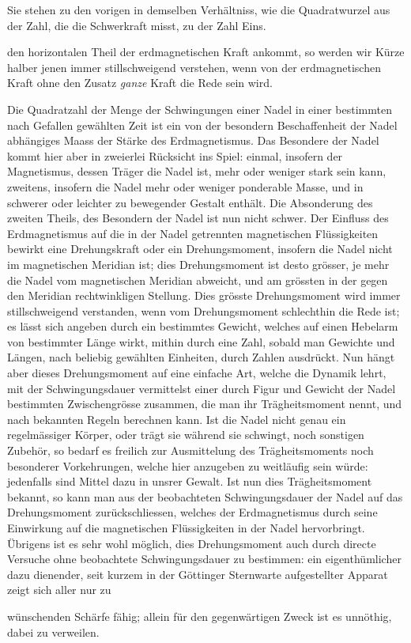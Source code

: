 \expandafter\def\csname HistoricalNoteText337\endcsname{Sie stehen zu den vorigen in demselben Verhältniss, wie die Quadratwurzel aus der Zahl, die die Schwerkraft misst, zu der Zahl Eins.}
\par\clearpage
{}
\noindent den horizontalen Theil der erdmagnetischen Kraft ankommt, so werden wir Kürze halber jenen immer stillschweigend verstehen, wenn von der erdmagnetischen Kraft ohne den Zusatz \textit{ganze} Kraft die Rede sein wird.

Die Quadratzahl der Menge der Schwingungen einer Nadel in einer bestimmten nach Gefallen gewählten Zeit ist ein von der besondern Beschaffenheit der Nadel abhängiges Maass der Stärke des Erdmagnetismus. Das Besondere der Nadel kommt hier aber in zweierlei Rücksicht ins Spiel: einmal, insofern der Magnetismus, dessen Träger die Nadel ist, mehr oder weniger stark sein kann, zweitens, insofern die Nadel mehr oder weniger ponderable Masse, und in schwerer oder leichter zu bewegender Gestalt enthält. Die Absonderung des zweiten Theils, des Besondern der Nadel ist nun nicht schwer. Der Einfluss des Erdmagnetismus auf die in der Nadel getrennten magnetischen Flüssigkeiten bewirkt eine Drehungskraft oder ein Drehungsmoment, insofern die Nadel nicht im magnetischen Meridian ist; dies Drehungsmoment ist desto grösser, je mehr die Nadel vom magnetischen Meridian abweicht, und am grössten in der gegen den Meridian rechtwinkligen Stellung. Dies grösste Drehungsmoment wird immer stillschweigend verstanden, wenn vom Drehungsmoment schlechthin die Rede ist; es lässt sich angeben durch ein bestimmtes Gewicht, welches auf einen Hebelarm von bestimmter Länge wirkt, mithin durch eine Zahl, sobald man Gewichte und Längen, nach beliebig gewählten Einheiten, durch Zahlen ausdrückt. Nun hängt aber dieses Drehungsmoment auf eine einfache Art, welche die Dynamik lehrt, mit der Schwingungsdauer vermittelst einer durch Figur und Gewicht der Nadel bestimmten Zwischengrösse zusammen, die man ihr Trägheitsmoment nennt, und nach bekannten Regeln berechnen kann. Ist die Nadel nicht genau ein regelmässiger Körper, oder trägt sie während sie schwingt, noch sonstigen Zubehör, so bedarf es freilich zur Ausmittelung des Trägheitsmoments noch besonderer Vorkehrungen, welche hier anzugeben zu weitläufig sein würde: jedenfalls sind Mittel dazu in unsrer Gewalt. Ist nun dies Trägheitsmoment bekannt, so kann man aus der beobachteten Schwingungsdauer der Nadel auf das Drehungsmoment zurückschliessen, welches der Erdmagnetismus durch seine Einwirkung auf die magnetischen Flüssigkeiten in der Nadel hervorbringt. Übrigens ist es sehr wohl möglich, dies Drehungsmoment auch durch directe Versuche ohne beobachtete Schwingungsdauer zu bestimmen: ein eigenthümlicher dazu dienender, seit kurzem in der Göttinger Sternwarte aufgestellter Apparat zeigt sich aller nur zu
\par\clearpage
{}
\noindent wünschenden Schärfe fähig; allein für den gegenwärtigen Zweck ist es unnöthig, dabei zu verweilen.


